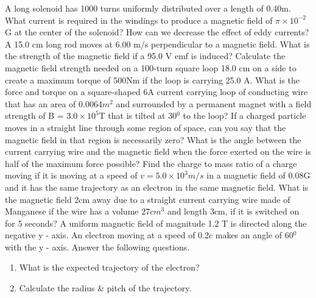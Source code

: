 \documentclass[12pt,addpoints]{exam}
\begin{document}
\begin{questions}
		\question A long solenoid has 1000 turns uniformly distributed over a length of 0.40m. What current is required in the windings to produce a magnetic field of $\pi\times10^{-2}$G at the center of the solenoid?\vspace{1.5in}
		\question How can we decrease the effect of eddy currents?\vspace{1.5in}
		\question A 15.0 cm long rod moves at 6.00 m/s perpendicular to a magnetic field. What is the strength of the magnetic field if a 95.0 V emf is induced?\vspace{1.5in}
		\question Calculate the magnetic field strength needed on a 100-turn square loop 18.0 cm on a side to create a maximum torque of
		500Nm if the loop is carrying 25.0 A.\vspace{1.5in}
		\question What is the force and torque on a square-shaped 6A current carrying loop of conducting wire that has an area of 0.0064$m^2$ and surrounded by a permanent magnet with a field strength of B = $3.0\times10^5$T that is tilted at 30$^0$ to the loop?\vspace{1.5in}
		\question If a charged particle moves in a straight line through some region of space, can you say that the magnetic field in that region is necessarily zero?\vspace{1.5in}
		\question What is the angle between the current carrying wire and the magnetic field when the force exerted on the wire is half of the maximum force possible?\vspace{1.5in}
		\question Find the charge to mass ratio of a charge moving if it is moving at a speed of $v = 5.0\times10^3 m/s$ in a magnetic field of 0.08G and it has the same trajectory as an electron in the same magnetic field.\vspace{1.5in}
		\question What is the magnetic field 2cm away due to a straight current carrying wire made of Manganese if the wire has a volume $27cm^3$ and length 3cm, if it is switched on for 5 seconds?\vspace{1.5in}
		\question A uniform magnetic field of magnitude 1.2 T is directed along the negative y - axis. An electron moving at a speed of 0.2$c$ makes an angle of 60$^0$ with the y - axis. Answer the following questions.
		\begin{enumerate}[label=(\roman*)]
			\item What is the expected trajectory of the electron?\vspace{1.5in}
			\item Calculate the radius \& pitch of the trajectory.\vspace{1.5in}

\end{enumerate}
\end{questions}
\end{document}
